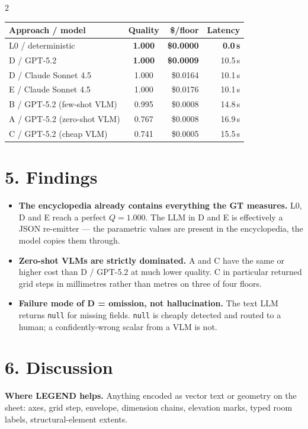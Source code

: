 \documentclass[a0,portrait]{a0poster}
\begin{document}
\begin{multicols}{2}
\begin{center}
\renewcommand{\arraystretch}{1.18}
\begin{tabular}{@{}lcrr@{}}
\toprule
\textbf{Approach / model} & \textbf{Quality} & \textbf{\$/floor} & \textbf{Latency}\\
\midrule
L0 / deterministic           & \textbf{1.000} & \textbf{\$0.0000} & \textbf{0.0\,s}\\
D / GPT-5.2                  & \textbf{1.000} & \textbf{\$0.0009} & 10.5\,s\\
D / Claude Sonnet 4.5        & 1.000 & \$0.0164 & 10.1\,s\\
E / Claude Sonnet 4.5        & 1.000 & \$0.0176 & 10.1\,s\\
B / GPT-5.2 (few-shot VLM)   & 0.995 & \$0.0008 & 14.8\,s\\
A / GPT-5.2 (zero-shot VLM)  & 0.767 & \$0.0008 & 16.9\,s\\
C / GPT-5.2 (cheap VLM)      & 0.741 & \$0.0005 & 15.5\,s\\
\bottomrule
\end{tabular}
\end{center}\vspace{0.4cm}

\section*{5. Findings}
\begin{itemize}
\item \textbf{The encyclopedia already contains everything the GT measures.}
L0, D and E reach a perfect $Q=1.000$. The LLM in D and E is effectively a
JSON re-emitter --- the parametric values are present in the encyclopedia,
the model copies them through.
\item \textbf{Zero-shot VLMs are strictly dominated.} A and C have the same
or higher cost than D / GPT-5.2 at much lower quality. C in particular
returned grid steps in millimetres rather than metres on three of four
floors.
\item \textbf{Failure mode of D = omission, not hallucination.} The text LLM
returns \texttt{null} for missing fields. \texttt{null} is cheaply detected
and routed to a human; a confidently-wrong scalar from a VLM is not.
\end{itemize}

\section*{6. Discussion}
\textbf{Where LEGEND helps.} Anything encoded as vector text or geometry on
the sheet: axes, grid step, envelope, dimension chains, elevation marks,
typed room labels, structural-element extents.


\end{multicols}
\end{document}
